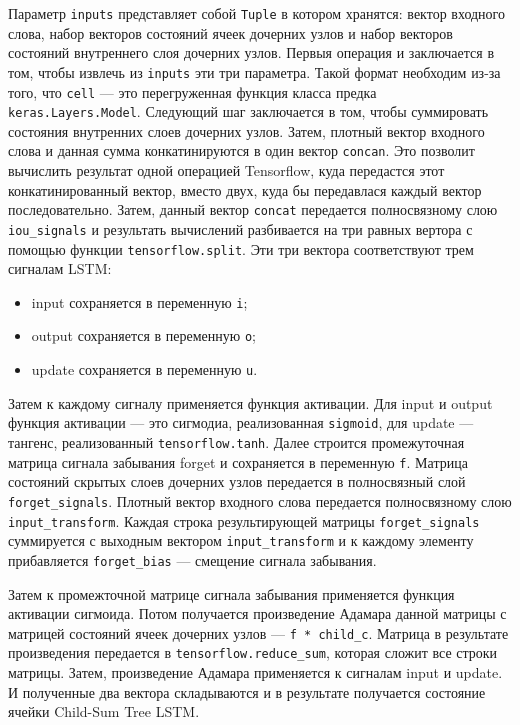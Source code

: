 Параметр \texttt{inputs} представляет собой \texttt{Tuple} в котором хранятся: вектор входного слова, набор векторов состояний ячеек дочерних узлов и набор векторов состояний внутреннего слоя дочерних узлов. Первыя операция и заключается в том, чтобы извлечь из \texttt{inputs} эти три параметра. Такой формат необходим из-за того, что \texttt{cell} --- это перегруженная функция класса предка \texttt{keras.Layers.Model}. Следующий шаг заключается в том, чтобы суммировать состояния внутренних слоев дочерних узлов. Затем, плотный вектор входного слова и данная сумма конкатинируются в один вектор \texttt{concan}. Это позволит вычислить результат одной операцией Tensorflow, куда передастся этот конкатинированный вектор, вместо двух, куда бы передавлася каждый вектор последовательно. Затем, данный вектор \texttt{concat} передается полносвязному слою \texttt{iou\_signals} и результать вычислений разбивается на три равных вертора с помощью функции \texttt{tensorflow.split}. Эти три вектора соответствуют трем сигналам LSTM\@:
\begin{itemize}
\item input сохраняется в переменную \texttt{i};
\item output сохраняется в переменную \texttt{o};
\item update сохраняется в переменную \texttt{u}.
\end{itemize}

Затем к каждому сигналу применяется функция активации. Для input и output функция активации --- это сигмодиа, реализованная \texttt{sigmoid}, для update --- тангенс, реализованный \texttt{tensorflow.tanh}. Далее строится промежуточная матрица сигнала забывания forget и сохраняется в переменную \texttt{f}. Матрица состояний скрытых слоев дочерних узлов передается в полносвязный слой \texttt{forget\_signals}. Плотный вектор входного слова передается полносвязному слою \texttt{input\_transform}. Каждая строка результирующей матрицы \texttt{forget\_signals} суммируется с выходным вектором \texttt{input\_\-transform} и к каждому элементу прибавляется \texttt{forget\_bias} --- смещение сигнала забывания.

Затем к промежточной матрице сигнала забывания применяется функция активации сигмоида. Потом получается произведение Адамара данной матрицы с матрицей состояний ячеек дочерних узлов --- \texttt{f * child\_c}. Матрица в результате произведения передается в \texttt{tensorflow.reduce\_sum}, которая сложит все строки матрицы. Затем, произведение Адамара применяется к сигналам input и update. И полученные два вектора складываются и в результате получается состояние ячейки Child-Sum Tree LSTM\@.

